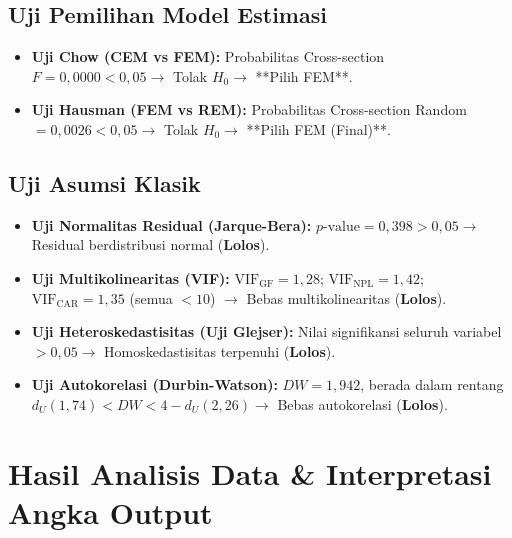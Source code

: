 \documentclass[11pt,a4paper]{article}
\begin{document}
\subsection{Uji Pemilihan Model Estimasi}
\begin{itemize}
    \item \textbf{Uji Chow (CEM vs FEM):} Probabilitas Cross-section $F = 0{,}0000 < 0{,}05 \rightarrow$ Tolak $H_0 \rightarrow$ **Pilih FEM**.
    \item \textbf{Uji Hausman (FEM vs REM):} Probabilitas Cross-section Random $= 0{,}0026 < 0{,}05 \rightarrow$ Tolak $H_0 \rightarrow$ **Pilih FEM (Final)**.
\end{itemize}

\subsection{Uji Asumsi Klasik}
\begin{itemize}
    \item \textbf{Uji Normalitas Residual (Jarque-Bera):} $p\text{-value} = 0{,}398 > 0{,}05 \rightarrow$ Residual berdistribusi normal (\textbf{Lolos}).
    \item \textbf{Uji Multikolinearitas (VIF):} $\text{VIF}_{\text{GF}} = 1{,}28$; $\text{VIF}_{\text{NPL}} = 1{,}42$; $\text{VIF}_{\text{CAR}} = 1{,}35$ (semua $< 10$) $\rightarrow$ Bebas multikolinearitas (\textbf{Lolos}).
    \item \textbf{Uji Heteroskedastisitas (Uji Glejser):} Nilai signifikansi seluruh variabel $> 0{,}05 \rightarrow$ Homoskedastisitas terpenuhi (\textbf{Lolos}).
    \item \textbf{Uji Autokorelasi (Durbin-Watson):} $DW = 1{,}942$, berada dalam rentang $d_U (1{,}74) < DW < 4 - d_U (2{,}26) \rightarrow$ Bebas autokorelasi (\textbf{Lolos}).
\end{itemize}

\section{Hasil Analisis Data \& Interpretasi Angka Output}
\end{document}
